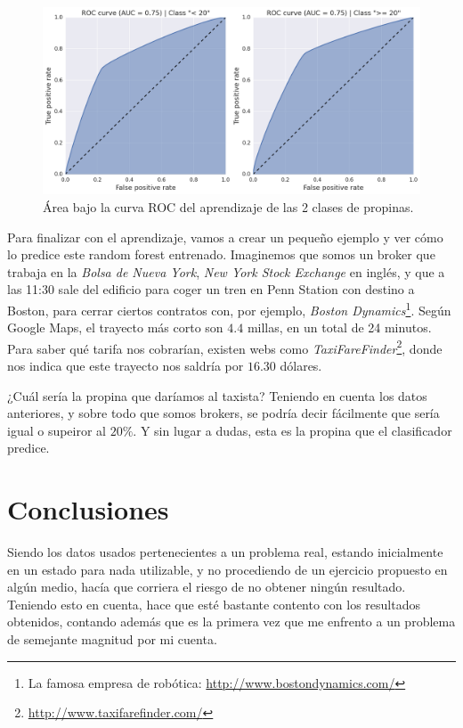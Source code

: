\begin{figure}[H]
  \centering
  \includegraphics[width=140mm]{figures/ch_05/roc_auc.png}
  \caption{Área bajo la curva ROC del aprendizaje de las 2 clases de propinas.}
  \label{fig:5.18}
\end{figure}

Para finalizar con el aprendizaje, vamos a crear un pequeño ejemplo y ver cómo lo predice este random forest entrenado. Imaginemos que somos un broker que trabaja en la \emph{Bolsa de Nueva York}, \emph{New York Stock Exchange} en inglés, y que a las 11:30 sale del edificio para coger un tren en Penn Station con destino a Boston, para cerrar ciertos contratos con, por ejemplo, \emph{Boston Dynamics}\footnote{La famosa empresa de robótica: \url{http://www.bostondynamics.com/}}. Según Google Maps, el trayecto más corto son $4.4$ millas, en un total de 24 minutos. Para saber qué tarifa nos cobrarían, existen webs como \emph{TaxiFareFinder}\footnote{\url{http://www.taxifarefinder.com/}}, donde nos indica que este trayecto nos saldría por $16.30$ dólares.

¿Cuál sería la propina que daríamos al taxista? Teniendo en cuenta los datos anteriores, y sobre todo que somos brokers, se podría decir fácilmente que sería igual o supeiror al $20\%$. Y sin lugar a dudas, esta es la propina que el clasificador predice.

\section{Conclusiones} \label{sec:5.4}

Siendo los datos usados pertenecientes a un problema real, estando inicialmente en un estado para nada utilizable, y no procediendo de un ejercicio propuesto en algún medio, hacía que corriera el riesgo de no obtener ningún resultado. Teniendo esto en cuenta, hace que esté bastante contento con los resultados obtenidos, contando además que es la primera vez que me enfrento a un problema de semejante magnitud por mi cuenta.

